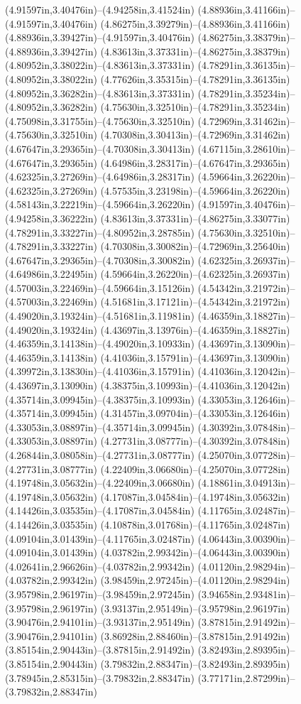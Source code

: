 (4.91597in,3.40476in)--(4.94258in,3.41524in) (4.88936in,3.41166in)--(4.91597in,3.40476in) (4.86275in,3.39279in)--(4.88936in,3.41166in) (4.88936in,3.39427in)--(4.91597in,3.40476in) (4.86275in,3.38379in)--(4.88936in,3.39427in) (4.83613in,3.37331in)--(4.86275in,3.38379in) (4.80952in,3.38022in)--(4.83613in,3.37331in) (4.78291in,3.36135in)--(4.80952in,3.38022in) (4.77626in,3.35315in)--(4.78291in,3.36135in) (4.80952in,3.36282in)--(4.83613in,3.37331in) (4.78291in,3.35234in)--(4.80952in,3.36282in) (4.75630in,3.32510in)--(4.78291in,3.35234in) (4.75098in,3.31755in)--(4.75630in,3.32510in) (4.72969in,3.31462in)--(4.75630in,3.32510in) (4.70308in,3.30413in)--(4.72969in,3.31462in) (4.67647in,3.29365in)--(4.70308in,3.30413in) (4.67115in,3.28610in)--(4.67647in,3.29365in) (4.64986in,3.28317in)--(4.67647in,3.29365in) (4.62325in,3.27269in)--(4.64986in,3.28317in) (4.59664in,3.26220in)--(4.62325in,3.27269in) (4.57535in,3.23198in)--(4.59664in,3.26220in) (4.58143in,3.22219in)--(4.59664in,3.26220in) (4.91597in,3.40476in)--(4.94258in,3.36222in) (4.83613in,3.37331in)--(4.86275in,3.33077in) (4.78291in,3.33227in)--(4.80952in,3.28785in) (4.75630in,3.32510in)--(4.78291in,3.33227in) (4.70308in,3.30082in)--(4.72969in,3.25640in) (4.67647in,3.29365in)--(4.70308in,3.30082in) (4.62325in,3.26937in)--(4.64986in,3.22495in) (4.59664in,3.26220in)--(4.62325in,3.26937in) (4.57003in,3.22469in)--(4.59664in,3.15126in) (4.54342in,3.21972in)--(4.57003in,3.22469in) (4.51681in,3.17121in)--(4.54342in,3.21972in) (4.49020in,3.19324in)--(4.51681in,3.11981in) (4.46359in,3.18827in)--(4.49020in,3.19324in) (4.43697in,3.13976in)--(4.46359in,3.18827in) (4.46359in,3.14138in)--(4.49020in,3.10933in) (4.43697in,3.13090in)--(4.46359in,3.14138in) (4.41036in,3.15791in)--(4.43697in,3.13090in) (4.39972in,3.13830in)--(4.41036in,3.15791in) (4.41036in,3.12042in)--(4.43697in,3.13090in) (4.38375in,3.10993in)--(4.41036in,3.12042in) (4.35714in,3.09945in)--(4.38375in,3.10993in) (4.33053in,3.12646in)--(4.35714in,3.09945in) (4.31457in,3.09704in)--(4.33053in,3.12646in) (4.33053in,3.08897in)--(4.35714in,3.09945in) (4.30392in,3.07848in)--(4.33053in,3.08897in) (4.27731in,3.08777in)--(4.30392in,3.07848in) (4.26844in,3.08058in)--(4.27731in,3.08777in) (4.25070in,3.07728in)--(4.27731in,3.08777in) (4.22409in,3.06680in)--(4.25070in,3.07728in) (4.19748in,3.05632in)--(4.22409in,3.06680in) (4.18861in,3.04913in)--(4.19748in,3.05632in) (4.17087in,3.04584in)--(4.19748in,3.05632in) (4.14426in,3.03535in)--(4.17087in,3.04584in) (4.11765in,3.02487in)--(4.14426in,3.03535in) (4.10878in,3.01768in)--(4.11765in,3.02487in) (4.09104in,3.01439in)--(4.11765in,3.02487in) (4.06443in,3.00390in)--(4.09104in,3.01439in) (4.03782in,2.99342in)--(4.06443in,3.00390in) (4.02641in,2.96626in)--(4.03782in,2.99342in) (4.01120in,2.98294in)--(4.03782in,2.99342in) (3.98459in,2.97245in)--(4.01120in,2.98294in) (3.95798in,2.96197in)--(3.98459in,2.97245in) (3.94658in,2.93481in)--(3.95798in,2.96197in) (3.93137in,2.95149in)--(3.95798in,2.96197in) (3.90476in,2.94101in)--(3.93137in,2.95149in) (3.87815in,2.91492in)--(3.90476in,2.94101in) (3.86928in,2.88460in)--(3.87815in,2.91492in) (3.85154in,2.90443in)--(3.87815in,2.91492in) (3.82493in,2.89395in)--(3.85154in,2.90443in) (3.79832in,2.88347in)--(3.82493in,2.89395in) (3.78945in,2.85315in)--(3.79832in,2.88347in) (3.77171in,2.87299in)--(3.79832in,2.88347in) 